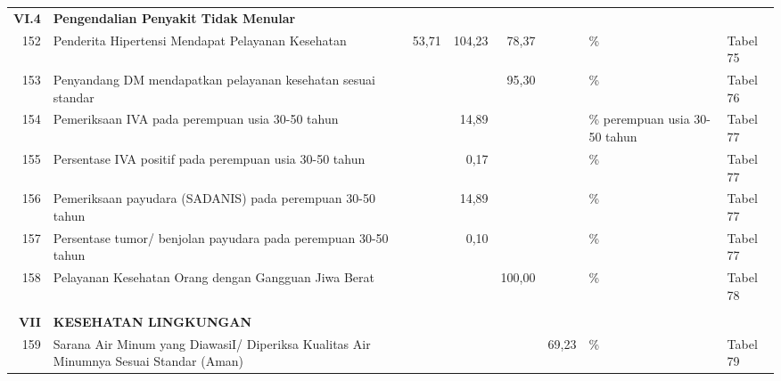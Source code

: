 \begin{small}
\begin{longtable}{rY{12em}rrrrY{5em}Y{5em}}
	        \textbf{VI.4} & \textbf{Pengendalian Penyakit Tidak Menular}                                          &        &        &         &                   &                                &          \\
	                  152 & Penderita Hipertensi Mendapat Pelayanan Kesehatan                                     &  53,71 & 104,23 &   78,37 &                   & \%                             & Tabel 75 \\
	153 & Penyandang DM  mendapatkan pelayanan kesehatan sesuai standar                         &        &        &   95,30 &                   & \%                             & Tabel 76 \\
	                  154 & Pemeriksaan IVA pada perempuan usia 30-50 tahun                                       &        &  14,89 &         &                   & \% perempuan usia 30-50 tahun  & Tabel 77 \\
	155 & Persentase IVA positif pada perempuan usia 30-50 tahun                                &        &   0,17 &         &                   & \%                             & Tabel 77 \\
	                  156 & Pemeriksaan payudara (SADANIS) pada perempuan 30-50 tahun                             &        &  14,89 &         &                   & \%                             & Tabel 77 \\
	157 & Persentase tumor/ benjolan payudara pada perempuan 30-50 tahun                        &        &   0,10 &         &                   & \%                             & Tabel 77 \\
	                  158 & Pelayanan Kesehatan Orang dengan Gangguan Jiwa Berat                                  &        &        &  100,00 &                   & \%                             & Tabel 78 \\
	                      &                                                                                       &        &        &         &                   &                                &          \\
	         \textbf{VII} & \textbf{KESEHATAN LINGKUNGAN}                                                         &        &        &         &                   &                                &          \\
	                  159 & Sarana Air Minum yang DiawasiI/ Diperiksa Kualitas Air Minumnya Sesuai Standar (Aman) &        &        &         &             69,23 & \%                             & Tabel 79 \\

\end{longtable}
\end{small}
